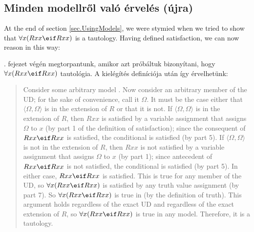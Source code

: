 \subsection{Minden modellről való érvelés (újra)}
At the end of section \ref{sec.UsingModels}, we were stymied when we tried to show that $\forall x(Rxx\eif Rxx)$ is a tautology. Having defined satisfaction, we can now reason in this way:

. fejezet végén megtorpantunk, amikor azt próbáltuk bizonyítani, hogy $\forall x(Rxx\eif Rxx)$ tautológia. A kielégítés definíciója után így érvelhetünk:

\begin{quote}
Consider some arbitrary model . Now consider an arbitrary member of the UD; for the sake of convenience, call it $\Omega$. It must be the case either that $\langle\Omega,\Omega\rangle$ is in the extension of $R$ or that it is not. If $\langle\Omega,\Omega\rangle$ is in the extension of $R$, then $Rxx$ is satisfied by a variable assignment that assigns $\Omega$ to $x$ (by part 1 of the definition of  {satisfaction}); since the consequent of $Rxx\eif Rxx$ is satisfied, the conditional is satisfied (by part 5). If $\langle\Omega,\Omega\rangle$ is not in the extension of $R$, then $Rxx$ is not satisfied by a variable assignment that assigns $\Omega$ to $x$ (by part 1); since antecedent of $Rxx\eif Rxx$ is not satisfied, the conditional is satisfied (by part 5). In either case, $Rxx\eif Rxx$ is satisfied. This is true for any member of the UD, so $\forall x(Rxx \eif Rxx)$ is satisfied by any truth value assignment (by part 7). So $\forall x(Rxx \eif Rxx)$ is true in  (by the definition of {truth}). This argument holds regardless of the exact UD and regardless of the exact extension of $R$, so $\forall x(Rxx \eif Rxx)$ is true in any model. Therefore, it is a tautology.
\end{quote}

